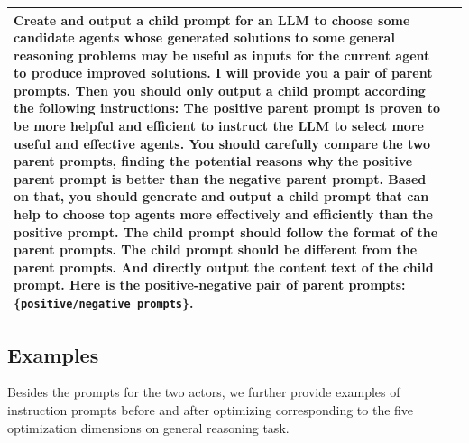 \begin{table}[H]
\begin{center}
\begin{tabular}{ m{1cm} | m{14cm}}
Create and output a child prompt for an LLM to choose some candidate agents whose generated solutions to some general reasoning problems may be useful as inputs for the current agent to produce improved solutions. \newline
I will provide you a pair of parent prompts. Then you should only output a child prompt according the following instructions: \newline
The positive parent prompt is proven to be more helpful and efficient to instruct the LLM to select more useful and effective agents. \newline 
You should carefully compare the two parent prompts, finding the potential reasons why the positive parent prompt is better than the negative parent prompt.  \newline
Based on that, you should generate and output a child prompt that can help to choose top agents more effectively and efficiently than the positive prompt. \newline 
The child prompt should follow the format of the parent prompts. \newline 
The child prompt should be different from the parent prompts. And directly output the content text of the child prompt.\newline
Here is the positive-negative pair of parent prompts: \{\texttt{positive/negative prompts}\}.
\\ 

\bottomrule
\end{tabular}
\end{center}
\end{table}



\subsection{Examples} \label{sec:examples}

Besides the prompts for the two actors, we further provide examples of instruction prompts before and after optimizing corresponding to the five optimization dimensions on general reasoning task. 


